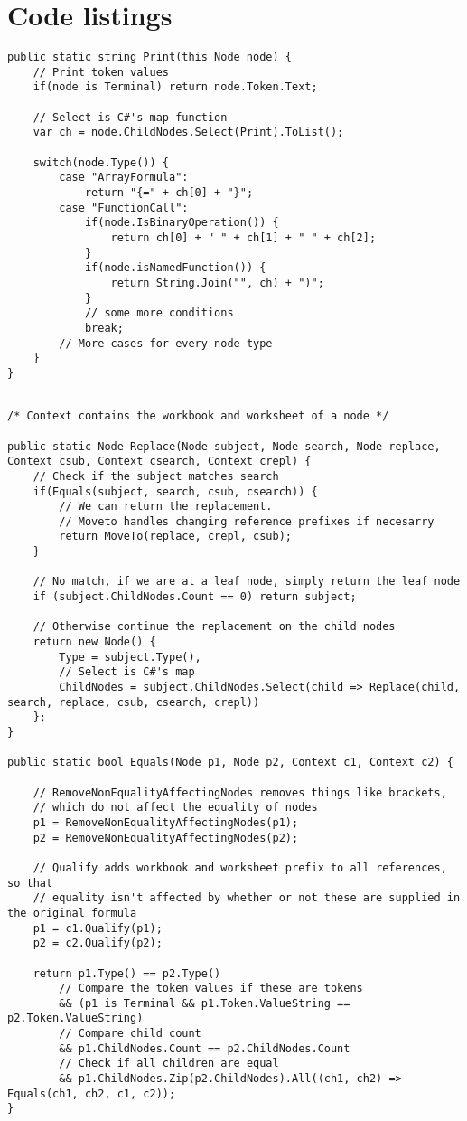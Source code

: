 \chapter{Code listings}

\lstset{style=sharpc}
\begin{lstlisting}[float,caption={XLParser Print method (simplified)}, label={lst:xlparserprint}]
public static string Print(this Node node) {
	// Print token values
	if(node is Terminal) return node.Token.Text;
	
	// Select is C#'s map function
	var ch = node.ChildNodes.Select(Print).ToList();
	
	switch(node.Type()) {
		case "ArrayFormula":
			return "{=" + ch[0] + "}";
		case "FunctionCall":
			if(node.IsBinaryOperation()) {
				return ch[0] + " " + ch[1] + " " + ch[2];
			}
			if(node.isNamedFunction()) {
				return String.Join("", ch) + ")";
			}
			// some more conditions
			break;
		// More cases for every node type
	}
}
\end{lstlisting}

\lstset{style=sharpc}
\begin{lstlisting}[float,caption={Formula AST replacement (simplified)}, label={lst:astreplace}]

/* Context contains the workbook and worksheet of a node */

public static Node Replace(Node subject, Node search, Node replace, Context csub, Context csearch, Context crepl) {
	// Check if the subject matches search
	if(Equals(subject, search, csub, csearch)) {
		// We can return the replacement.
		// Moveto handles changing reference prefixes if necesarry 
		return MoveTo(replace, crepl, csub);
	}
	
	// No match, if we are at a leaf node, simply return the leaf node
	if (subject.ChildNodes.Count == 0) return subject;
	
	// Otherwise continue the replacement on the child nodes
	return new Node() {
		Type = subject.Type(),
		// Select is C#'s map
		ChildNodes = subject.ChildNodes.Select(child => Replace(child, search, replace, csub, csearch, crepl))
	};
}

public static bool Equals(Node p1, Node p2, Context c1, Context c2) {
	
	// RemoveNonEqualityAffectingNodes removes things like brackets,
	// which do not affect the equality of nodes
	p1 = RemoveNonEqualityAffectingNodes(p1);
	p2 = RemoveNonEqualityAffectingNodes(p2);
	
	// Qualify adds workbook and worksheet prefix to all references, so that
	// equality isn't affected by whether or not these are supplied in the original formula
	p1 = c1.Qualify(p1);
	p2 = c2.Qualify(p2);
	
	return p1.Type() == p2.Type()
		// Compare the token values if these are tokens
	    && (p1 is Terminal && p1.Token.ValueString == p2.Token.ValueString)
	    // Compare child count
	    && p1.ChildNodes.Count == p2.ChildNodes.Count
	    // Check if all children are equal
	    && p1.ChildNodes.Zip(p2.ChildNodes).All((ch1, ch2) => Equals(ch1, ch2, c1, c2));
}
\end{lstlisting}

